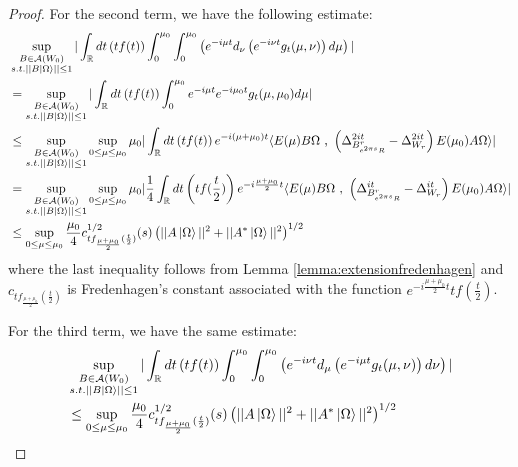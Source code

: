\documentclass[a4paper,11pt]{article}
\theoremstyle{definition}
\newcommand{\lb}{\left(}
\newcommand{\rb}{\right)}
\begin{document}
\begin{proof}
    For the second term, we have the following estimate:
    {\small
\begin{align}
        \begin{split}
            &\sup_{\substack{B\in\mathcal{A}(W_0)\\s.t.||B\ket{\Omega}||\leq 1}}|\int_\mathbb{R} dt \lb tf(t) \rb\int_0^{\mu_0}\int_0^{\mu_0}\lb e^{-i\mu t}d_\nu\lb e^{-i\nu t}g_t(\mu,\nu) \rb d\mu \rb|
            \\&
            =\sup_{\substack{B\in\mathcal{A}(W_0)\\s.t.||B\ket{\Omega}||\leq 1}}|\int_\mathbb{R}dt \lb tf(t)\rb\int_0^{\mu_0}e^{-i\mu t} e^{-i\mu_0 t}g_t(\mu,\mu_0) d\mu|
            \\&
            \leq \sup_{\substack{B\in\mathcal{A}(W_0)\\s.t.||B\ket{\Omega}||\leq 1}}\sup_{0\leq\mu\leq\mu_0}\mu_0|\int_\mathbb{R} dt\lb tf(t) \rb e^{-i(\mu + \mu_0) t}\langle E(\mu)B\Omega\text{ , }\lb\Delta^{2it}_{B^r_{e^{2\pi s}R}} - \Delta^{2it}_{W_r}\rb E(\mu_0)A\Omega \rangle|
            \\&
            =\sup_{\substack{B\in\mathcal{A}(W_0)\\s.t.||B\ket{\Omega}||\leq 1}}\sup_{0\leq \mu\leq\mu_0}\mu_0|\frac{1}{4}\int_\mathbb{R} dt \lb tf(\frac{t}{2}) \rb e^{-i\frac{\mu + \mu_0}{2}t}\langle E(\mu)B\Omega\text{ , }\lb\Delta^{it}_{B^r_{e^{2\pi s}R}} - \Delta^{it}_{W_r}\rb E(\mu_0)A\Omega \rangle|
            \\&
            \leq \sup_{0\leq \mu\leq\mu_0}\frac{\mu_0}{4} c^{1/2}_{tf_{\frac{\mu + \mu_0}{2}}(\frac{t}{2})}(s)\lb||A\ket{\Omega}||^2 + ||A^*\ket{\Omega}||^2\rb^{1/2}
        \end{split}
    \end{align}
}
    where the last inequality follows from Lemma \ref{lemma:extensionfredenhagen} and $c_{tf_{\frac{\mu + \mu_0}{2}}(\frac{t}{2})}$ is Fredenhagen's constant associated with the function $e^{-i\frac{\mu + \mu_0}{2}t}tf(\frac{t}{2})$.

    For the third term, we have the same estimate:
    \begin{align}
        \begin{split}
            &\sup_{\substack{B\in\mathcal{A}(W_0)\\s.t.||B\ket{\Omega}||\leq 1}}|\int_\mathbb{R} dt \lb tf(t) \rb\int_0^{\mu_0}\int_0^{\mu_0}\lb e^{-i\nu t}d_\mu\lb e^{-i\mu t}g_t(\mu,\nu) \rb d\nu \rb|\\&
            \leq\sup_{0\leq \mu\leq\mu_0}\frac{\mu_0}{4}c^{1/2}_{tf_{\frac{\mu + \mu_0}{2}}(\frac{t}{2})}(s)\lb||A\ket{\Omega}||^2 + ||A^*\ket{\Omega}||^2\rb^{1/2}
        \end{split}
    \end{align}


\end{proof}
\end{document}
